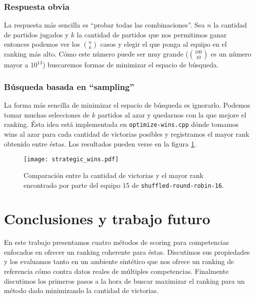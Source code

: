 \documentclass[a4paper]{article}
\begin{document}
\subsubsection{Respuesta obvia}

La respuesta más sencilla es ``probar todas las combinaciones''. Sea $n$ la cantidad de partidos jugados y $k$ la cantidad de partidos que nos permitimos ganar entonces podemos ver los $\binom{n}{k}$ casos y elegir el que ponga al equipo en el ranking más alto. Cómo este número puede ser muy grande ($\binom{100}{10}$ es un número mayor a $10^{13}$) buscaremos formas de minimizar el espacio de búsqueda.

\subsubsection{Búsqueda basada en ``sampling''}

La forma más sencilla de minimizar el espacio de búsqueda es ignorarlo. Podemos tomar muchas selecciones de $k$ partidos al azar y quedarnos con la que mejore el ranking. Ésta idea está implementada en \texttt{optimize-wins.cpp} dónde tomamos wins al azar para cada cantidad de victorias posibles y registramos el mayor rank obtenido entre éstas. Los resultados pueden verse en la figura \ref{fig:samplingranks}.

\begin{figure}[H]
    \centering
    \texttt{[image: strategic\_wins.pdf]}
    \caption{Comparación entre la cantidad de victorias y el mayor rank encontrado por parte del equipo $15$ de \texttt{shuffled-round-robin-16}.}
    \label{fig:samplingranks}
\end{figure}

\section{Conclusiones y trabajo futuro}

En este trabajo presentamos cuatro métodos de scoring para competencias enfocados en ofrecer un ranking coherente para éstas. Discutimos sus propiedades y los evaluamos tanto en un ambiente sintético que nos ofrece un ranking de referencia cómo contra datos reales de múltiples competencias. Finalmente discutimos los primeros pasos a la hora de buscar maximizar el ranking para un método dado minimizando la cantidad de victorias.
\end{document}
